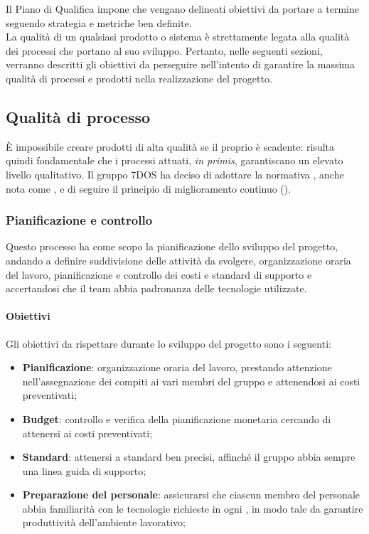 Il Piano di Qualifica impone che vengano delineati obiettivi da portare a termine seguendo strategia e metriche ben definite.\\
La qualità di un qualsiasi prodotto o sistema è strettamente legata alla qualità dei processi che portano al suo sviluppo. Pertanto, nelle seguenti sezioni, verranno descritti gli obiettivi da perseguire nell'intento di garantire la massima qualità di processi e prodotti nella realizzazione del progetto.

\subsection{Qualità di processo}
	È impossibile creare prodotti di alta qualità se il proprio  è scadente: risulta quindi fondamentale che i processi attuati, \emph{in primis}, garantiscano un elevato livello qualitativo. Il gruppo 7DOS ha deciso di adottare la normativa , anche nota come , e di seguire il principio di miglioramento continuo ().


\subsubsection{Pianificazione e controllo}
Questo processo ha come scopo la pianificazione dello sviluppo del progetto, andando a definire suddivisione delle attività da svolgere, organizzazione oraria del lavoro, pianificazione e controllo dei costi e standard di supporto e accertandosi che il team abbia padronanza delle tecnologie utilizzate.
\paragraph{Obiettivi} \Spazio
Gli obiettivi da rispettare durante lo sviluppo del progetto sono i seguenti:
	\begin{itemize}
		\item{\textbf{Pianificazione}: organizzazione oraria del lavoro, prestando attenzione nell'assegnazione dei compiti ai vari membri del gruppo e attenendosi ai costi preventivati;
		}
		\item{\textbf{Budget}: controllo e verifica della pianificazione monetaria cercando di attenersi ai costi preventivati;
		}
		\item{\textbf{Standard}: attenersi a standard ben precisi, affinché il gruppo abbia sempre una linea guida di supporto;
		}
		\item{\textbf{Preparazione del personale}: assicurarsi che ciascun membro del personale abbia familiarità con le tecnologie richieste in ogni , in modo tale da garantire produttività dell'ambiente lavorativo;
		}
	\end{itemize}


